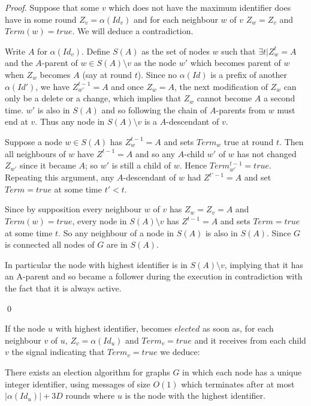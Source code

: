 \documentclass[11pt,envcountsame,letterpaper]{llncs}
\begin{document}
\begin{proof}
Suppose that some $v$ which does not have the maximum identifier
does have in some round $Z_v=\alpha(Id_v)$ and for each neighbour $w$ of $v$
$Z_w=Z_v$ and $Term(w)=true$. We will deduce a contradiction.

Write $A$ for $\alpha(Id_v)$.
Define $S(A)$ as the set of nodes $w$ such that $\exists t | Z_w^t=A$
and the $A$-parent of $w\in S(A)\setminus v$ as the node $w'$ which becomes
parent of $w$ when $Z_w$ becomes $A$ (say at round $t$).
Since no $\alpha(Id)$ is a prefix of another $\alpha(Id')$,
we have $Z_{w'}^{t-1}=A$ and
once $Z_w=A$, the next modification of $Z_w$ can only be a delete or a change,
which implies that $Z_w$ cannot become $A$ a second time.
$w'$ is also in $S(A)$ and so following the chain of
$A$-parents from $w$ must end at $v$.
Thus any node in $S(A)\setminus v$ is a $A$-descendant of $v$.

Suppose a node $w\in S(A)$ has $Z_w^{t-1}=A$ and sets $Term_w$ true at round $t$. Then all
neighbours of $w$ have $Z^{t-1}=A$ and so any $A$-child $w'$
of $w$ has not changed
$Z_{w'}$ since it became $A$; so $w'$ is still a child of $w$.
Hence $Term_{w'}^{t-1}=true$.
Repeating this argument, any $A$-descendant of $w$ had $Z^{t'-1}=A$ and
set $Term=true$ at some time $t'<t$.

Since by supposition every neighbour $w$ of $v$ has $Z_w=Z_v=A$ and $Term(w)=true$, 
every node in $S(A)\setminus v$
has $Z^{t-1}=A$ and
sets $Term=true$ at some time $t$. So any neighbour of a node
in $S(A)$ is also in $S(A)$. Since $G$ is connected all nodes of $G$
are in $S(A)$.

In particular the node with highest identifier is in $S(A) \setminus v$,
implying that it has an A-parent and so became a follower during the execution
in contradiction with the fact that it is always active.

\qed
\end{proof}
If the node $u$ with highest identifier, 
 becomes $elected$ as soon as, for each neighbour $v$ of $u$, 
 $Z_v=\alpha(Id_u)$ and $Term_v=true$ 
and it receives 
from each child $v$  the signal 
indicating that $Term_v=true$ we deduce:

\begin{theorem}
\label{th:main}
There exists an election algorithm for graphs $G$
in which each node has a unique integer identifier, using
messages of size $O(1)$ which terminates
after at most $|\alpha(Id_u)|+3 D$ rounds
where $u$ is the node with the highest identifier.
\end{theorem}
\end{document}
